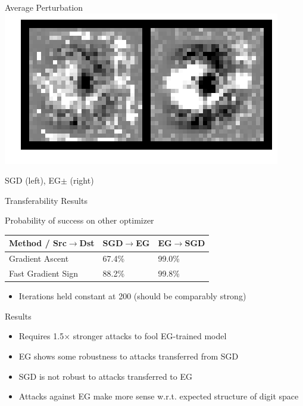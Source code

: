 \documentclass{beamer}
\begin{document}
	\begin{frame}{Average Perturbation}
		\centering
		\includegraphics[width=\textwidth]{avg_attack_3}
		
		SGD (left), EG$\pm$ (right)
	\end{frame}
	
	\begin{frame}{Transferability Results}
		\begin{block}{Probability of success on other optimizer}
			\begin{center}
				\begin{tabular}{ l | l | l }
					Method / Src$\rightarrow$Dst & SGD$\rightarrow$EG & EG$\rightarrow$SGD  \\ \hline
					Gradient Ascent & 67.4\% & 99.0\% \\ \hline
					Fast Gradient Sign & 88.2\% & 99.8\%
				\end{tabular}
			\end{center}
		\end{block}
		\begin{itemize}
			\item Iterations held constant at 200 (should be comparably strong)
		\end{itemize}
	\end{frame}
	
	\begin{frame}{Results}
		\begin{itemize}
			\item Requires 1.5$\times$ stronger attacks to fool EG-trained model
			\item EG shows some robustness to attacks transferred from SGD
			\item SGD is not robust to attacks transferred to EG
			\item Attacks against EG make more sense w.r.t. expected structure of digit space
		\end{itemize}
	\end{frame}
\end{document}
